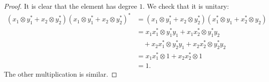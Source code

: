 \documentclass[10pt,a4paper]{amsart}
\begin{document}
\begin{proof}
It is clear that the element has degree $1$. We check that it is unitary:
\begin{align*}
( x_1 \otimes y_1^* + x_2 \otimes y_2^* )( x_1 \otimes y_1^* + x_2 \otimes y_2^* )^*
&= ( x_1 \otimes y_1^* + x_2 \otimes y_2^* )( x_1^* \otimes y_1 +  x_2^* \otimes y_2 ) \\
&= x_1  x_1^* \otimes y_1^* y_1
 + x_1  x_2^* \otimes y_1^* y_2\\
&\quad + x_2  x_1^* \otimes y_2^* y_1
 + x_2  x_2^* \otimes y_2^* y_2 \\
&= x_1 x_1^* \otimes 1 + x_2 x_2^* \otimes 1 \\
&= 1.
\end{align*}
The other multiplication is similar.
\end{proof}
\end{document}
